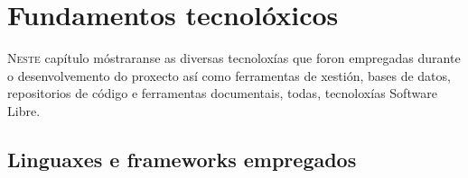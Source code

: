 \chapter{Fundamentos tecnolóxicos}
\minitoc


  \lettrine{N}{este} capítulo móstraranse as diversas tecnoloxías que foron 
empregadas durante o desenvolvemento do proxecto así como ferramentas de 
xestión, bases de datos, repositorios de código e ferramentas documentais, 
todas, tecnoloxías Software Libre.


  \section{Linguaxes e frameworks empregados}

